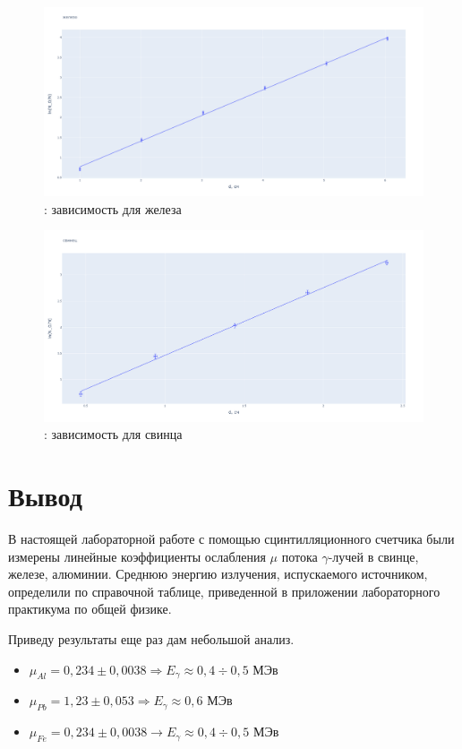 	\begin{figure}[h!]
		\centering
		\includegraphics[width=1.0\linewidth]{pics/fr.png}
		\caption{ : зависимость для железа}
		\label{fr}
	\end{figure}

	\begin{figure}[h!]
		\centering
		\includegraphics[width=1.0\linewidth]{pics/pb.png}
		\caption{ : зависимость для свинца}
		\label{pb}
	\end{figure}

	\newpage

	\section{Вывод}
	В настоящей лабораторной работе с помощью сцинтилляционного счетчика были измерены линейные коэффициенты ослабления $\mu$ потока $\gamma$-лучей в свинце, железе, алюминии. 
	Среднюю энергию излучения, испускаемого источником, определили по справочной таблице, приведенной в приложении лабораторного практикума по общей физике.

	Приведу результаты еще раз дам небольшой анализ.

	\begin{itemize}
		\item $\mu_{Al} = 0,234 \pm 0,0038 \Rightarrow E_{\gamma} \approx 0,4 \div 0,5 \text{ МЭв} $
		\item $\mu_{Pb} = 1,23 \pm 0,053 \Rightarrow E_{\gamma} \approx 0,6 \text{ МЭв} $
		\item $\mu_{Fe} = 0,234 \pm 0,0038 \rightarrow E_{\gamma} \approx 0,4 \div 0,5 \text{ МЭв} $
	\end{itemize}


